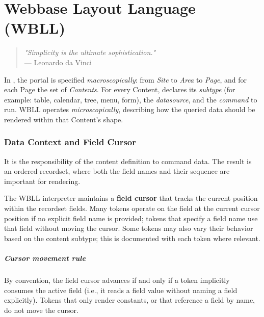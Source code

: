 
\chapter{Webbase Layout Language (WBLL)}
\label{chap:wbll}

\begin{quote}
\textit{"Simplicity is the ultimate sophistication."} \\
— Leonardo da Vinci
\end{quote}

In \wbdl{}, the portal is specified \textit{macroscopically}: from \emph{Site} to \emph{Area} to \emph{Page}, and for each Page the set of \emph{Contents}. For every Content, \wbdl{} declares its \emph{subtype} (for example: table, calendar, tree, menu, form), the \emph{datasource}, and the \emph{command} to run. WBLL operates \textit{microscopically}, describing how the queried data should be rendered within that Content’s shape.

\subsection{Data Context and Field Cursor}

It is the responsibility of the \wbdl{} content definition to command data. The result is an ordered recordset, where both the field names and their sequence are important for rendering.

The WBLL interpreter maintains a \textbf{field cursor} that tracks the current position within the recordset fields. Many tokens operate on the field at the current cursor position if no explicit field name is provided; tokens that specify a field name use that field without moving the cursor. Some tokens may also vary their behavior based on the content subtype; this is documented with each token where relevant.

\paragraph{Cursor movement rule}
By convention, the field cursor advances if and only if a token implicitly consumes the active field (i.e., it reads a field value without naming a field explicitly). Tokens that only render constants, or that reference a field by name, do not move the cursor.

